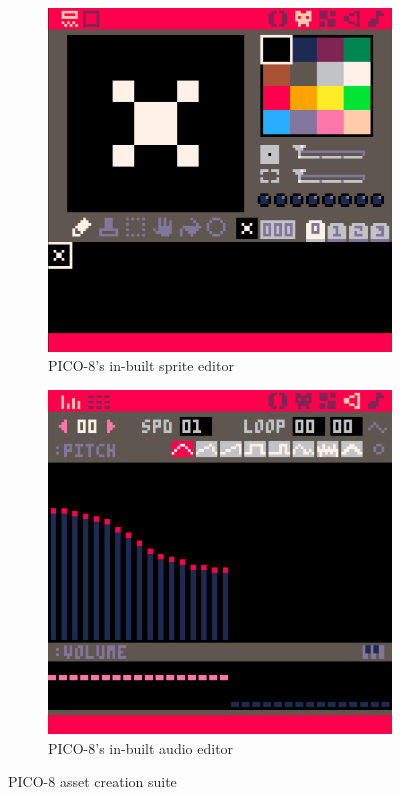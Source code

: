 \documentclass[11pt]{article}
\begin{document}
\begin{figure}[h]
\begin{subfigure}{.5\textwidth}
  \centering
  \includegraphics[width=.8\linewidth]{sprite_editor}
  \caption{PICO-8's in-built sprite editor}
  \label{fig:pfig1}
\end{subfigure}
\begin{subfigure}{.5\textwidth}
  \centering
  \includegraphics[width=.8\linewidth]{audio_editor}
  \caption{PICO-8's in-built audio editor}
  \label{fig:pfig2}
\end{subfigure}
\caption{PICO-8 asset creation suite}
\label{fig:pico}
\end{figure}
\end{document}

